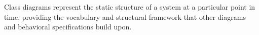 Class diagrams represent the static structure of a system at a particular point in 
time, providing the vocabulary and structural framework that other diagrams and 
behavioral specifications build upon.





